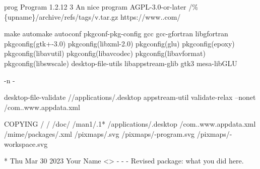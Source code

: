 {\scriptsize{
\begin{script}
      prog
  Program
   1.2.12
   3
   An nice program
   AGPL-3.0-or-later
   \gitauth/\%\{upname\}/archive/refs/tags/v.tar.gz
        https://www..com/

 make
 automake
 autoconf
 pkgconf-pkg-config
 gcc
 gcc-gfortran
 libgfortran
 pkgconfig(gtk+-3.0)
 pkgconfig(libxml-2.0)
 pkgconfig(glu)
 pkgconfig(epoxy)
 pkgconfig(libavutil)
 pkgconfig(libavcodec)
 pkgconfig(libavformat)
 pkgconfig(libswscale)
 desktop-file-utils
 libappstream-glib
 gtk3
 mesa-libGLU

 -n -



desktop-file-validate //applications/.desktop
appstream-util validate-relax --nonet /com..www.appdata.xml

 COPYING
/
/
/doc/
/man1/.1*
/applications/.desktop
/com..www.appdata.xml
/mime/packages/.xml
/pixmaps/.svg
/pixmaps/-program.svg
/pixmaps/-workspace.svg

* Thu Mar 30 2023 Your Name <\email> - -
- Revised package: what you did here.
\end{script}
}}

